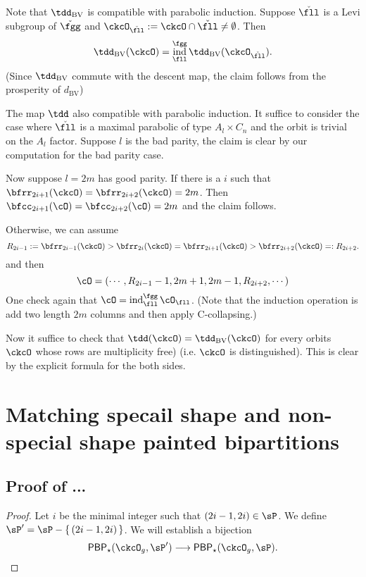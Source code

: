 \documentclass[12pt,a4paper]{amsart}
\DeclareMathOperator{\ind}{ind}
\numberwithin{equation}{section}
\theoremstyle{remark}
\def\dBV{d_{\mathrm{BV}}}
\begin{document}
{Note that $\tdBV$ is compatible with parabolic induction.
Suppose $\ckfll$ is a Levi subgroup of $\ckfgg$ and
$\ckcO_{\ckfll}:=\ckcO\cap \ckfll\neq \emptyset$.
Then
\[
\tdBV(\ckcO) = \ind_{\fll}^{\fgg} \tdBV(\ckcO_{\ckfll}).
\]
(Since $\tdBV$ commute with the descent map, the claim follows from the
prosperity of $\dBV$)

The map $\tdd$ also compatible with parabolic induction.
It suffice to consider the case where $\ckfll$ is a maximal parabolic of type
$A_{l}\times C_{n}$ and
the orbit is trivial on the $A_{l}$ factor.
Suppose $l$ is the bad parity, the claim is clear by our computation for the bad
parity case.

Now suppose $l=2m$ has good parity. If there is a $i$ such that
$\bfrr_{2i+1}(\ckcO)=\bfrr_{2i+2}(\ckcO)=2m$. Then
$\bfcc_{2i+1}(\cO)=\bfcc_{2i+2}(\cO)=2m$ and the claim follows.

Otherwise, we can assume
\[
R_{2i-1}:=\bfrr_{2i-1}(\ckcO)> \bfrr_{2i}(\ckcO)=\bfrr_{2i+1}(\ckcO) > \bfrr_{2i+2}(\ckcO)=:R_{2i+2}.
\]
and then
\[
\cO = (\cdots, R_{2i-1}-1, 2m+1, 2m-1, R_{2i+2}, \cdots)
\]
One check again that $\cO = \ind_{\fll}^{\fgg}\cO_{\fll}$.
(Note that the induction operation is add two length $2m$ columns and then apply
C-collapsing.)

Now it suffice to check that
$\tdd(\ckcO) = \tdBV(\ckcO)$ for every orbits $\ckcO$ whose
rows are multiplicity free) (i.e. $\ckcO$ is distinguished).
This is clear by the explicit formula for the both sides.
}

\section{Matching specail shape and non-special shape painted bipartitions}
\label{app:comb}

\subsection{Proof of ...}
\begin{proof}
  Let $i$ be the minimal integer such that $(2i-1, 2i)\in \sP$.
  We define $\sP' = \sP - \set{(2i-1,2i)}$.
  We will establish a bijection
  \[
    \PBP_{\star}(\ckcO_{g}, \sP')\longrightarrow \PBP_{\star}(\ckcO_{g},\sP).
  \]
\end{proof}

\end{document}
